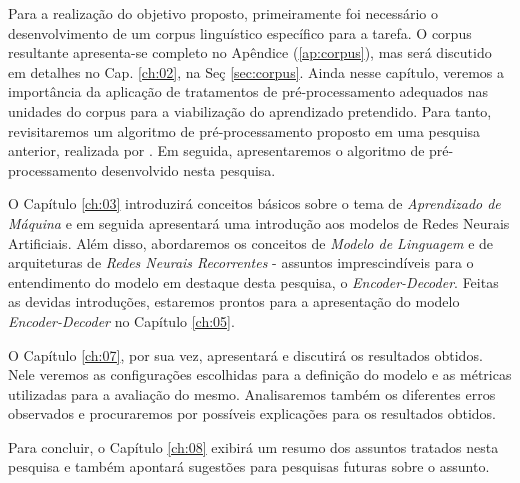 Para a realização do objetivo proposto, primeiramente foi necessário o desenvolvimento de um corpus linguístico específico para a tarefa. O corpus resultante apresenta-se completo no Apêndice (\ref{ap:corpus}), mas será discutido em detalhes no Cap. \ref{ch:02}, na Seç \ref{sec:corpus}. Ainda nesse capítulo, veremos a importância da aplicação de tratamentos de pré-processamento adequados nas unidades do corpus para a viabilização do aprendizado pretendido. Para tanto, revisitaremos um algoritmo de pré-processamento proposto em uma pesquisa anterior, realizada por \cite{rumelhart:1986}. Em seguida, apresentaremos o algoritmo de pré-processamento desenvolvido nesta pesquisa.

O Capítulo \ref{ch:03} introduzirá conceitos básicos sobre o tema de \textit{Aprendizado de Máquina} e em seguida apresentará uma introdução aos modelos de Redes Neurais Artificiais. Além disso, abordaremos os conceitos de \textit{Modelo de Linguagem} e de arquiteturas de \textit{Redes Neurais Recorrentes} - assuntos imprescindíveis para o entendimento do modelo em destaque desta pesquisa, o \textit{Encoder-Decoder}. Feitas as devidas introduções, estaremos prontos para a apresentação do modelo \textit{Encoder-Decoder} no Capítulo \ref{ch:05}.  

O Capítulo \ref{ch:07}, por sua vez, apresentará e discutirá os resultados obtidos. Nele veremos as configurações escolhidas para a definição do modelo e as métricas utilizadas para a avaliação do mesmo. Analisaremos também os diferentes erros observados e procuraremos por possíveis explicações para os resultados obtidos. 

Para concluir, o Capítulo \ref{ch:08} exibirá um resumo dos assuntos tratados nesta pesquisa e também apontará sugestões para pesquisas futuras sobre o assunto.




